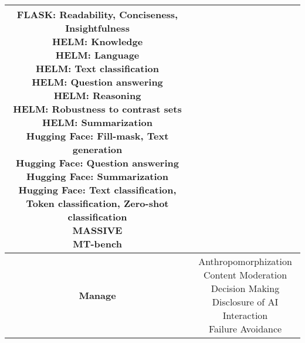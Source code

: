 \documentclass[fleqn]{article}
\begin{document}
\begin{table}[H]
\begin{tabular}{|c|c|}
{			\textbullet\hspace{3pt} FLASK: Readability, Conciseness, Insightfulness \\ 
			\textbullet\hspace{3pt} HELM: Knowledge \\ 
			\textbullet\hspace{3pt} HELM: Language \\ 
			\textbullet\hspace{3pt} HELM: Text classification \\ 
			\textbullet\hspace{3pt} HELM: Question answering \\ 
			\textbullet\hspace{3pt} HELM: Reasoning \\ 
			\textbullet\hspace{3pt} HELM: Robustness to contrast sets \\ 
			\textbullet\hspace{3pt} HELM: Summarization \\ 
			\textbullet\hspace{3pt} Hugging Face: Fill-mask, Text generation  \\ 
			\textbullet\hspace{3pt} Hugging Face: Question answering \\ 
			\textbullet\hspace{3pt} Hugging Face: Summarization \\ 
			\textbullet\hspace{3pt} Hugging Face: Text classification, Token classification, Zero-shot classification \\ 
			\textbullet\hspace{3pt} MASSIVE  \\ 
			\textbullet\hspace{3pt} MT-bench \\ 
		}		
		\\
		\hline		
		\textbf{Manage} &
		\makecell[l]{ 	
			\textbullet\hspace{3pt} Anthropomorphization \\
			\textbullet\hspace{3pt} Content Moderation \\ 
			\textbullet\hspace{3pt} Decision Making \\ 
			\textbullet\hspace{3pt} Disclosure of AI Interaction \\ 
			\textbullet\hspace{3pt} Failure Avoidance \\
}
\end{tabular}
\end{table}
\end{document}
